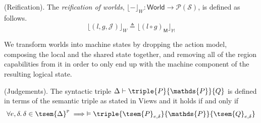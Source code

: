 \begin{defn}
	(Reification).
	The \emph{reification of worlds}, $\lfloor - \rfloor_W : \mathsf{World} \rightarrow \mathcal{P}(\mathcal{S})$, is defined as follows.
	\[
		\lfloor (l, g, \mathcal{J}) \rfloor_W \triangleq \lfloor (l \circ g)_\mathsf{M} \rfloor_\mathbb{M}
	\]
\end{defn}
We transform worlds into machine states by dropping the action model, composing the local and the shared state together, and removing all of the region capabilities from it in order to only end up with the machine component of the resulting logical state.

\begin{defn}
	(Judgements).
	The syntactic triple $\Delta \vdash \triple{P}{\mathds{P}}{Q}$ is defined in terms of the semantic triple as stated in Views \cite{views} and it holds if and only if
	\[
		\forall e, \delta \ldotp \delta \in \tsem{\Delta}^\textsc{p} \implies \vDash \triple{\tsem{P}_{e, \delta}}{\mathds{P}}{\tsem{Q}_{e, \delta}}
	\]
\end{defn}

